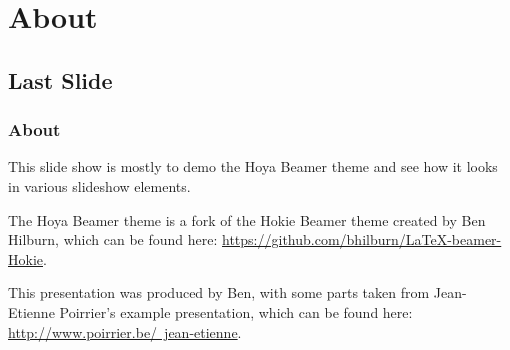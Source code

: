 \documentclass{beamer}
\begin{document}
\section{About}
\subsection{Last Slide}

\frame
{
	\frametitle{About}

	This slide show is mostly to demo the Hoya Beamer theme and see how it looks in various slideshow elements.
	
	\vspace{1em}
	
	The Hoya Beamer theme is a fork of the Hokie Beamer theme created by  Ben Hilburn, which can be found here: \href{https://github.com/bhilburn/LaTeX-beamer-Hokie}{https://github.com/bhilburn/LaTeX-beamer-Hokie}.
	
	\vspace{1em}
	
	This presentation was produced by Ben, with some parts taken from Jean-Etienne Poirrier's example presentation, which can be found here:  \href{http://www.poirrier.be/~jean-etienne}{http://www.poirrier.be/~jean-etienne}.
}
\end{document}
